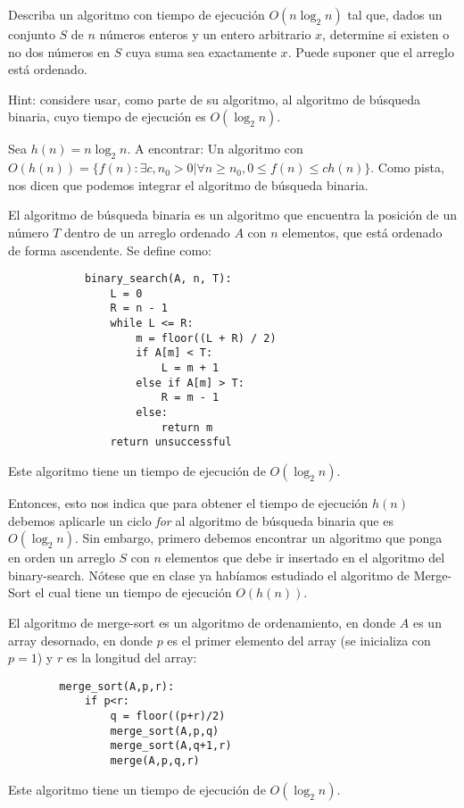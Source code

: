 




\begin{problema}
     Describa un algoritmo con tiempo de ejecución $O\left(n \log _2 n\right)$ tal que, dados un conjunto $S$ de $n$ números enteros y un entero arbitrario $x$, determine si existen o no dos números en $S$ cuya suma sea exactamente $x$. Puede suponer que el arreglo está ordenado. 
     \begin{cajita}
        Hint: considere usar, como parte de su algoritmo, al algoritmo de búsqueda binaria, cuyo tiempo de ejecución es $O\left(\log _2 n\right)$.
     \end{cajita}
     \begin{sol}
        Sea $h(n)=n\log_2 n$. A encontrar: Un algoritmo con $O(h(n))=\{f(n): \exists c,n_0>0 | \forall n\geq n_0,0\leq f(n)\leq ch(n)\}$. Como pista, nos dicen que podemos integrar el algoritmo de búsqueda binaria. 
        \begin{cajita}
            El algoritmo de búsqueda binaria es un algoritmo que encuentra la posición de un número $T$ dentro de un arreglo ordenado $A$ con $n$ elementos, que está ordenado de forma ascendente. Se define como: 
        \begin{verbatim}
            binary_search(A, n, T):
                L = 0
                R = n - 1
                while L <= R: 
                    m = floor((L + R) / 2)
                    if A[m] < T:
                        L = m + 1
                    else if A[m] > T: 
                        R = m - 1
                    else:
                        return m
                return unsuccessful
        \end{verbatim}
        Este algoritmo tiene un tiempo de ejecución de  $O\left(\log _2 n\right)$. 
        \end{cajita}
        Entonces, esto nos indica que para obtener el tiempo de ejecución $h(n)$ debemos aplicarle un ciclo \textit{for} al algoritmo de búsqueda binaria que es $O\left(\log _2 n\right)$. Sin embargo, primero debemos encontrar un algoritmo que ponga en orden un arreglo $S$ con $n$ elementos que debe ir insertado en el algoritmo del binary-search. Nótese que en clase ya habíamos estudiado el algoritmo de Merge-Sort el cual tiene un tiempo de ejecución $O(h(n))$.
        \begin{cajita}
            El algoritmo de merge-sort es un algoritmo de ordenamiento, en donde $A$ es un array desornado, en donde $p$ es el primer elemento del array (se inicializa con $p=1$) y $r$ es la longitud del array: 
        \begin{verbatim}
        merge_sort(A,p,r):
            if p<r: 
                q = floor((p+r)/2)
                merge_sort(A,p,q)
                merge_sort(A,q+1,r)
                merge(A,p,q,r)
        \end{verbatim}
        Este algoritmo tiene un tiempo de ejecución de  $O\left(\log _2 n\right)$. 
        \end{cajita}


\end{sol}
\end{problema}

